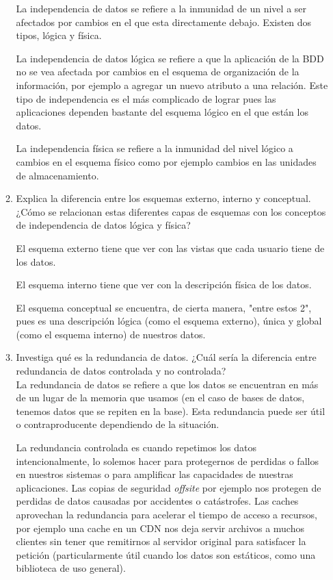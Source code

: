 \documentclass[12pt,a4paper]{article}
\begin{document}
\begin{enumerate}
\begin{enumerate}
			La independencia de datos se refiere a la inmunidad de un nivel a ser afectados por cambios	en el que esta directamente debajo. Existen dos tipos, lógica y física.

La independencia de datos lógica se refiere a que la aplicación de la BDD no se vea afectada por cambios en el esquema de organización de la información, por ejemplo a agregar un nuevo atributo a una relación. Este tipo de independencia es el más complicado de lograr pues las aplicaciones dependen bastante del esquema lógico en el que están los datos.

La independencia física se refiere a la inmunidad del nivel lógico a cambios en el esquema físico como por ejemplo cambios en las unidades de almacenamiento.

			\item Explica la diferencia entre los esquemas externo, interno y conceptual. ¿Cómo se relacionan estas
				diferentes capas de esquemas con los conceptos de independencia de datos lógica y física?

				El esquema externo tiene que ver con las vistas que cada usuario tiene de los datos.
				
				El esquema interno tiene que ver con la descripción física de los datos.
				
				El esquema conceptual se encuentra, de cierta manera, "entre estos 2", pues es una descripción lógica 
				(como el esquema externo), única y global (como el esquema interno) de nuestros datos.

			\item Investiga qué es la redundancia de datos. ¿Cuál sería la diferencia entre redundancia de datos
				controlada y no controlada?\\

				La redundancia de datos se refiere a que los datos se encuentran en más de un lugar de
				la memoria que usamos (en el caso de bases de datos, tenemos datos que se repiten en la base).
				Esta redundancia puede ser útil o contraproducente dependiendo de la situación.

				La redundancia controlada es cuando repetimos los datos intencionalmente, lo solemos
				hacer para protegernos de perdidas o fallos en nuestros sistemas o para amplificar las
				capacidades de nuestras aplicaciones.
				Las copias de seguridad \textit{offsite} por ejemplo nos protegen de perdidas de datos
				causadas por accidentes o catástrofes.
				Las caches aprovechan la redundancia para acelerar el tiempo de acceso a recursos,
				por ejemplo una cache en un CDN nos deja servir archivos a muchos clientes sin
				tener que remitirnos al servidor original para satisfacer la petición
				(particularmente útil cuando los datos son estáticos, como una biblioteca de uso general).


\end{enumerate}
\end{enumerate}
\end{document}
